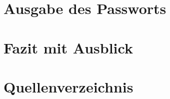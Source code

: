 \documentclass[a4paper,11pt,singlespacing]{article}
\begin{document}
    	\section{Ausgabe des Passworts}
    	
    	
    	
    	\section{Fazit mit Ausblick}
    	
    	\section{Quellenverzeichnis}
        
        
    	
\end{document}
